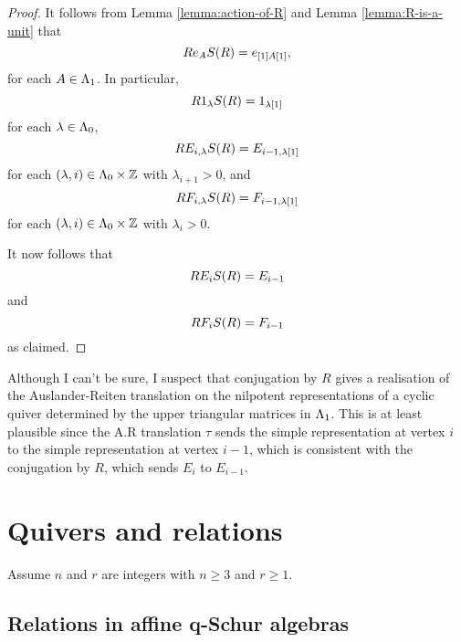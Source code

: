 \documentclass[a4paper, 11pt]{report}
\begin{document}
\begin{proof}
It follows from Lemma \ref{lemma:action-of-R} and Lemma \ref{lemma:R-is-a-unit} that
\begin{equation*}
Re_AS{(R)} = e_{[1]A[1]},
\end{equation*}
for each $A\in\Lambda_1{}$. In particular,
\begin{equation*}
R1_\lambda S{(R)} = 1_{\lambda[1]}
\end{equation*}
for each $\lambda\in\Lambda_0{}$,
\begin{equation*}
R E_{i,\lambda} S{(R)} = E_{i-1,\lambda[1]}
\end{equation*}
for each $(\lambda,i)\in\Lambda_0{}\times\mathbb{Z}$ with $\lambda_{i+1}>0$, and
\begin{equation*}
R F_{i,\lambda} S{(R)} = F_{i-1,\lambda[1]}
\end{equation*}
for each $(\lambda,i)\in\Lambda_0{}\times\mathbb{Z}$ with $\lambda_i>0$.

It now follows that
\begin{equation*}
R E_i S{(R)} = E_{i-1}
\end{equation*}
and
\begin{equation*}
R F_i S{(R)} = F_{i-1}
\end{equation*}
as claimed.
\end{proof}

{\color{blue}Although I can't be sure, I suspect that conjugation by $R$ gives a realisation of the Auslander-Reiten translation on the nilpotent representations of a cyclic quiver determined by the upper triangular matrices in $\Lambda_1{}$. This is at least plausible since the A.R translation $\tau$ sends the simple representation at vertex $i$ to the simple representation at vertex $i-1$, which is consistent with the conjugation by $R$, which sends $E_i$ to $E_{i-1}$.}



\section{Quivers and relations}

Assume $n$ and $r$ are integers with $n\geq 3$ and $r\geq 1$.

\subsection{Relations in affine q-Schur algebras}
\end{document}
